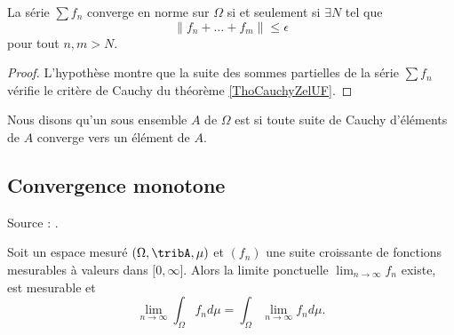 \begin{corollary}       \label{CorCauchyCkXnvY}
    La série \( \sum f_n\) converge en norme sur \( \Omega\) si et seulement si \( \exists N\) tel que
    \begin{equation}
        \| f_n+\ldots+f_m \|\leq \epsilon
    \end{equation}
    pour tout \( n,m>N\).
\end{corollary}

\begin{proof}
    L'hypothèse montre que la suite des sommes partielles de la série \( \sum f_n\) vérifie le critère de Cauchy du théorème \ref{ThoCauchyZelUF}.
\end{proof}

\begin{definition}
    Nous disons qu'un sous ensemble \( A\) de \( \Omega\) est  si toute suite de Cauchy d'éléments de \( A\) converge vers un élément de \( A\).
\end{definition}

\subsection{Convergence monotone}

Source : \cite{mathmecaChoi}.

\begin{theorem} \label{ThoConvMonFtBoVh}
    Soit un espace mesuré \( (\Omega,\tribA,\mu)\) et \( (f_n)\) une suite croissante de fonctions mesurables à valeurs dans \( \mathopen[ 0 , \infty \mathclose]\). Alors la limite ponctuelle \( \lim_{n\to \infty} f_n\) existe, est mesurable et
    \begin{equation}
        \lim_{n\to \infty} \int_{\Omega}f_nd\mu= \int_{\Omega}\lim_{n\to \infty} f_nd\mu.
    \end{equation}
\end{theorem}

